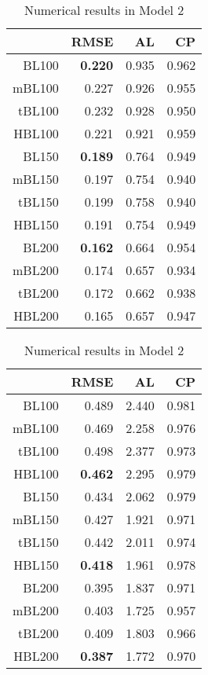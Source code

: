 \documentclass[11pt]{article}
\theoremstyle{plain}
\theoremstyle{definition}
\begin{document}
\begin{table}[h]
  \begin{minipage}[t]{.45\textwidth}
  \caption{Numerical results in Model 1}
    \begin{center}
      \begin{tabular}{rrrr}
  \hline
 & RMSE  & AL & CP  \\ 
  \hline
BL100 & {\bf 0.220}  & 0.935 & 0.962  \\ 
  mBL100 & 0.227  & 0.926 & 0.955  \\ 
  tBL100 & 0.232  & 0.928 & 0.950  \\ 
  HBL100 & 0.221  & 0.921 & 0.959  \\ \hline
  BL150 & {\bf 0.189}  & 0.764 & 0.949  \\ 
  mBL150 & 0.197  & 0.754 & 0.940  \\ 
  tBL150 & 0.199  & 0.758 & 0.940  \\ 
  HBL150 & 0.191  & 0.754 & 0.949  \\ \hline
  BL200 & {\bf 0.162}  & 0.664 & 0.954  \\ 
  mBL200 & 0.174  & 0.657 & 0.934  \\ 
  tBL200 & 0.172  & 0.662 & 0.938  \\ 
  HBL200 & 0.165  & 0.657 & 0.947  \\ 
   \hline
      \end{tabular}
    \end{center}
    \label{tab:model1}
  \end{minipage}
  \hfill
  \begin{minipage}[t]{.45\textwidth}
  \caption{Numerical results in Model 2}
    \begin{center}
      \begin{tabular}{rrrr}
  \hline
 & RMSE  & AL & CP  \\ 
  \hline
BL100 & 0.489  & 2.440 & 0.981  \\ 
  mBL100 & 0.469  & 2.258 & 0.976  \\ 
  tBL100 & 0.498  & 2.377 & 0.973  \\ 
  HBL100 & {\bf 0.462}  & 2.295 & 0.979  \\ \hline
  BL150 & 0.434  & 2.062 & 0.979  \\ 
  mBL150 & 0.427  & 1.921 & 0.971  \\ 
  tBL150 & 0.442  & 2.011 & 0.974  \\ 
  HBL150 & {\bf 0.418}  & 1.961 & 0.978  \\ \hline
  BL200 & 0.395  & 1.837 & 0.971  \\ 
  mBL200 & 0.403  & 1.725 & 0.957  \\ 
  tBL200 & 0.409  & 1.803 & 0.966  \\ 
  HBL200 & {\bf 0.387}  & 1.772 & 0.970  \\ 
   \hline      
      \end{tabular}
    \end{center}
    \label{tab:model2}
  \end{minipage}
\end{table}
\end{document}
